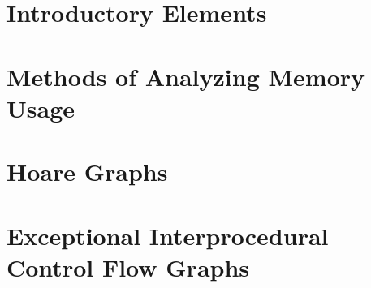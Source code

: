\documentclass[pageskip]{VTthesis}
\begin{document}
  \frontmatter %

  \tableofcontents
  \listofalgorithms
  \listoffigures
  \lstlistoflistings
  \listoftables
  \listoftheorems

  \printacronyms[heading=chapter]
  \printunsrtabbreviations[style=altlist] %
  \printunsrtglossary[type=symbols]


  \mainmatter %
  \acresetall %

  \part{Introductory Elements}
  
  

  \part{Methods of Analyzing Memory Usage}\label{memory-usage}
  
  
  

  \part{Hoare Graphs}\label{hg}
  
  
  
  

  \part{Exceptional Interprocedural Control Flow Graphs}\label{eicfg}
  
  
  
\end{document}
